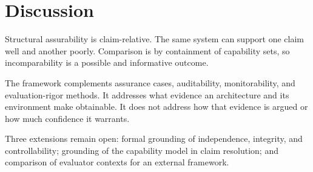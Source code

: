 \section{Discussion}
\label{aa.sec.discussion}

Structural assurability is claim-relative.
The same system can support one claim well and another poorly.
Comparison is by containment of capability sets, so incomparability is a possible and informative outcome.

The framework complements assurance cases, auditability, monitorability, and evaluation-rigor methods.
It addresses what evidence an architecture and its environment make obtainable.
It does not address how that evidence is argued or how much confidence it warrants.

Three extensions remain open:
formal grounding of independence, integrity, and controllability;
grounding of the capability model in claim resolution;
and comparison of evaluator contexts for an external framework.
